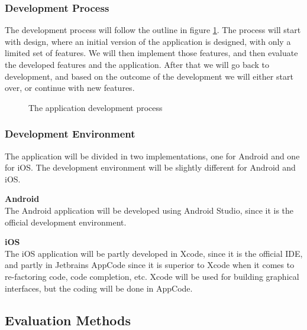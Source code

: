 \documentclass[12pt, a4paper, onecolumn]{article}
\newcommand{\parag}[1]{
	\textbf{#1} \hspace{0pt} \\
}
\begin{document}
	\subsubsection{Development Process}
	
	The development process will follow the outline in figure \ref{fig:development}. The process will start with design, where an initial version of the application is designed, with only a limited set of features. We will then implement those features, and then evaluate the developed features and the application. After that we will go back to development, and based on the outcome of the development we will either start over, or continue with new features.
	
	\begin{figure}[H]
		\centering
		\caption{The application development process}%
		\label{fig:development}%
	\end{figure}
	
	\subsubsection{Development Environment}
	
	The application will be divided in two implementations, one for Android and one for iOS. The development environment will be slightly different for Android and iOS. 
	
	\parag{Android}
	The Android application will be developed using Android Studio, since it is the official development environment.
	
	\parag{iOS}
	The iOS application will be partly developed in Xcode, since it is the official IDE, and partly in Jetbrains AppCode since it is superior to Xcode when it comes to re-factoring code, code completion, etc. Xcode will be used for building graphical interfaces, but the coding will be done in AppCode.
	
	\subsection{Evaluation Methods}
	
\end{document}
